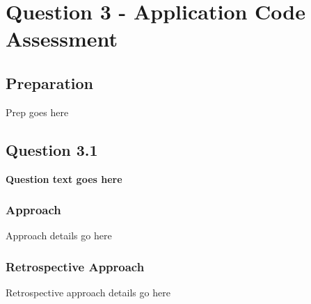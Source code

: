 \chapter{Question 3 - Application Code Assessment}

\section{Preparation}
Prep goes here

\section{Question 3.1}
\textbf{Question text goes here}
\subsection{Approach}
Approach details go here
\subsection{Retrospective Approach}
Retrospective approach details go here
